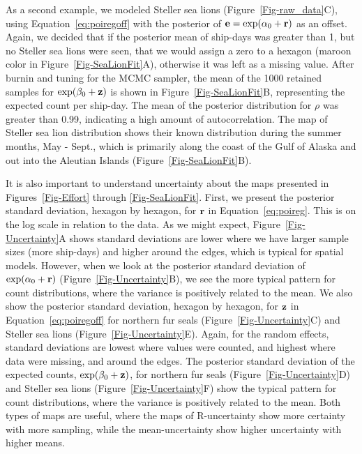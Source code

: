 \documentclass[11pt, titlepage]{article}
\begin{document}
\begin{spacing}{1.9}
\begin{flushleft}
As a second example, we modeled Steller sea lions (Figure~\ref{Fig-raw_data}C), using Equation~\eqref{eq:poiregoff} with the posterior of $\mathbf{e} = \exp(\alpha_{0} + \mathbf{r})$ as an offset. Again, we decided that if the posterior mean of ship-days was greater than 1, but no Steller sea lions were seen, that we would assign a zero to a hexagon (maroon color in Figure~\ref{Fig-SeaLionFit}A), otherwise it was left as a missing value. After burnin and tuning for the MCMC sampler, the mean of the 1000 retained samples for $\exp(\beta_{0} + \mathbf{z})$ is shown in Figure~\ref{Fig-SeaLionFit}B, representing the expected count per ship-day. The mean of the posterior distribution for $\rho$ was greater than 0.99, indicating a high amount of autocorrelation. The map of Steller sea lion distribution shows their known distribution  during the summer months, May - Sept., which is primarily along the coast of the Gulf of Alaska and out into the Aleutian Islands (Figure~\ref{Fig-SeaLionFit}B).

It is also important to understand uncertainty about the maps presented in Figures~\ref{Fig-Effort} through \ref{Fig-SeaLionFit}.  First, we present the posterior standard deviation, hexagon by hexagon, for $\mathbf{r}$ in Equation~\eqref{eq:poireg}.  This is on the log scale in relation to the data.  As we might expect, Figure~\ref{Fig-Uncertainty}A shows standard deviations are lower where we have larger sample sizes (more ship-days) and higher around the edges, which is typical for spatial models.  However, when we look at the posterior standard deviation of $\exp(\alpha_{0} + \mathbf{r})$ (Figure~\ref{Fig-Uncertainty}B), we see the more typical pattern for count distributions, where the variance is positively related to the mean.  We also show the posterior standard deviation, hexagon by hexagon, for $\mathbf{z}$ in Equation~\eqref{eq:poiregoff} for northern fur seals (Figure~\ref{Fig-Uncertainty}C) and Steller sea lions (Figure~\ref{Fig-Uncertainty}E).  Again, for the random effects, standard deviations are lowest where values were counted, and highest where data were missing, and around the edges. The posterior standard deviation of the expected counts, $\exp(\beta_{0} + \mathbf{z})$, for northern fur seals (Figure~\ref{Fig-Uncertainty}D) and Steller sea lions (Figure~\ref{Fig-Uncertainty}F) show the typical pattern for count distributions, where the variance is positively related to the mean.  Both types of maps are useful, where the maps of R-uncertainty show more certainty with more sampling, while the mean-uncertainty show higher uncertainty with higher means.  
 

\end{flushleft}
\end{spacing}
\end{document}
